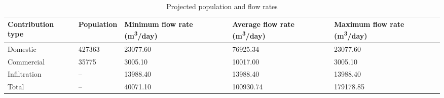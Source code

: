 \begin{table}[h]
    \centering
    \caption{Projected population and flow rates}
    \label{tab:projected_rates}
    \begin{tabular}{|p{3cm}|p{2.5cm}|p{3cm}|p{3cm}|p{3cm}|}
      \hline
      \textbf{Contribution type} & \textbf{Population} & \textbf{Minimum flow rate (m\textsuperscript{3}/day)} & \textbf{Average flow rate (m\textsuperscript{3}/day)} & \textbf{Maximum flow rate (m\textsuperscript{3}/day)} \\
      \hline
        Domestic  & 427363 & 23077.60 & 76925.34 & 23077.60 \\
        Commercial & 35775 & 3005.10 & 10017.00 & 3005.10 \\
        Infiltration & -- & 13988.40 & 13988.40 & 13988.40 \\
        Total & -- & 40071.10 & 100930.74 & 179178.85 \\
      \hline
    \end{tabular}
\end{table}
